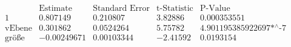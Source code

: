\[\begin{array}{l|llll}
 \text{} & \text{Estimate} & \text{Standard Error} & \text{t-Statistic} & \text{P-Value} \\
\hline
 1 & 0.807149 & 0.210807 & 3.82886 & 0.000353551 \\
 \text{vEbene} & 0.301862 & 0.0524264 & 5.75782 & \text{4.901195385922697$\grave{ }$*${}^{\wedge}$-7} \\
 \text{gr{\" o}{\ss}e} & -0.00249671 & 0.00103344 & -2.41592 & 0.0193154 \\
\end{array}\]

